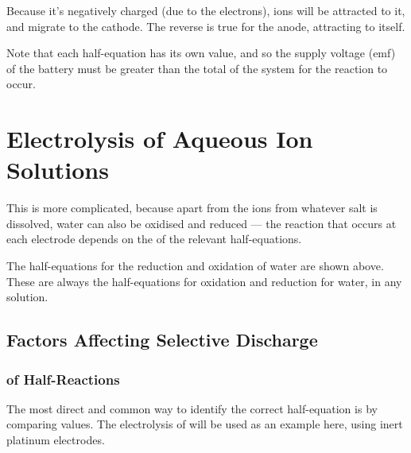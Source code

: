 		Because it's negatively charged (due to the electrons),  ions will be attracted
		to it, and migrate to the cathode. The reverse is true for the anode, attracting \ch{\Cl-} to itself.

		Note that each half-equation has its own \Eo{} value, and so the supply voltage (emf) of the battery must be greater than the total
		\Ecell{} of the system for the reaction to occur.




	\pagebreak
	\section{Electrolysis of Aqueous Ion Solutions}

		This is more complicated, because apart from the ions from whatever salt is dissolved, water can also be oxidised and reduced --- the
		reaction that occurs at each electrode depends on the \Eo{} of the relevant half-equations.


		The half-equations for the reduction and oxidation of water are shown above. These are always the half-equations for oxidation and
		reduction for water, in any solution.

		\subsection{Factors Affecting Selective Discharge}

			\subsubsection{\MEo{} of Half-Reactions}

				The most direct and common way to identify the correct half-equation is by comparing \Eo{} values.
				The electrolysis of  will be used as an example here, using inert platinum electrodes.



